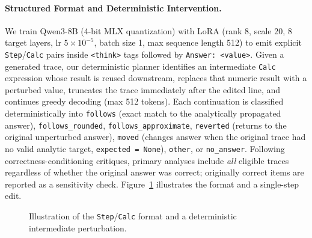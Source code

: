 \documentclass[11pt]{article}
\begin{document}
\paragraph{Structured Format and Deterministic Intervention.}
We train Qwen3-8B (4-bit MLX quantization) with LoRA (rank 8, scale 20, 8 target layers, lr $5\times 10^{-5}$, batch size 1, max sequence length 512) to emit explicit \texttt{Step}/\texttt{Calc} pairs inside \texttt{<think>} tags followed by \mbox{\texttt{Answer: <value>}}.
Given a generated trace, our deterministic planner identifies an intermediate \texttt{Calc} expression whose result is reused downstream, replaces that numeric result with a perturbed value, truncates the trace immediately after the edited line, and continues greedy decoding (max 512 tokens).
Each continuation is classified deterministically into \texttt{follows} (exact match to the analytically propagated answer), \texttt{follows\_rounded}, \texttt{follows\_approximate}, \texttt{reverted} (returns to the original unperturbed answer), \texttt{moved} (changes answer when the original trace had no valid analytic target, \texttt{expected = None}), \texttt{other}, or \texttt{no\_answer}.
Following correctness-conditioning critiques, primary analyses include \emph{all} eligible traces regardless of whether the original answer was correct; originally correct items are reported as a sensitivity check.
Figure~\ref{fig:example} illustrates the format and a single-step edit.

\begin{figure}[t]
\centering
\scriptsize
{}
\caption{Illustration of the \texttt{Step}/\texttt{Calc} format and a deterministic intermediate perturbation.}
\label{fig:example}
\end{figure}
\end{document}
